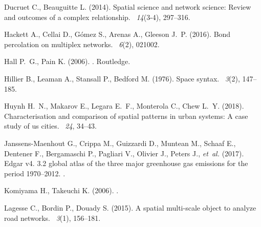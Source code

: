 \documentclass{article}
\begin{document}
\begin{thebibliography}{}
Ducruet C., Beauguitte L. (2014).
\newblock Spatial science and network science: Review and outcomes of a complex
  relationship.
~{\em 14\/}(3-4), 297--316.


Hackett A., Cellai D., G{\'o}mez S., Arenas A., Gleeson J.~P. (2016).
\newblock Bond percolation on multiplex networks.
~{\em 6\/}(2), 021002.


Hall P.~G., Pain K. (2006).
.
\newblock Routledge.


Hillier B., Leaman A., Stansall P., Bedford M. (1976).
\newblock Space syntax.
~{\em 3\/}(2),
  147--185.


Huynh H.~N., Makarov E., Legara E.~F., Monterola C., Chew L.~Y. (2018).
\newblock Characterisation and comparison of spatial patterns in urban systems:
  A case study of us cities.
~{\em 24}, 34--43.


Janssens-Maenhout G., Crippa M., Guizzardi D., Muntean M., Schaaf E., Dentener
  F., Bergamaschi P., Pagliari V., Olivier J., Peters J., \textit{et~al.}
  (2017).
\newblock Edgar v4. 3.2 global atlas of the three major greenhouse gas
  emissions for the period 1970--2012.
.


Komiyama H., Takeuchi K. (2006).
.


Lagesse C., Bordin P., Douady S. (2015).
\newblock A spatial multi-scale object to analyze road networks.
~{\em 3\/}(1), 156--181.



\end{thebibliography}
\end{document}
